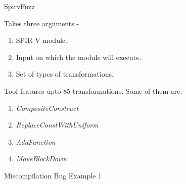 \documentclass{beamer}
\begin{document}
    
    \begin{frame}{SpirvFuzz}

        Takes three arguments - 
        \begin{enumerate}
            \item SPIR-V module.
            \item Input on which the module will execute.
            \item Set of types of transformations.
        \end{enumerate}

        Tool features upto 85 transformations. Some of them are:
        \begin{enumerate}
            \item \textit{CompositeConstruct}
            \item \textit{ReplaceConstWithUniform}
            \item \textit{AddFunction}
            \item \textit{MoveBlockDown}
        \end{enumerate}
    
    \end{frame}



    \begin{frame}{Miscompilation Bug Example 1}
        
        \begin{figure}
        \end{figure}

    \end{frame}
\end{document}
